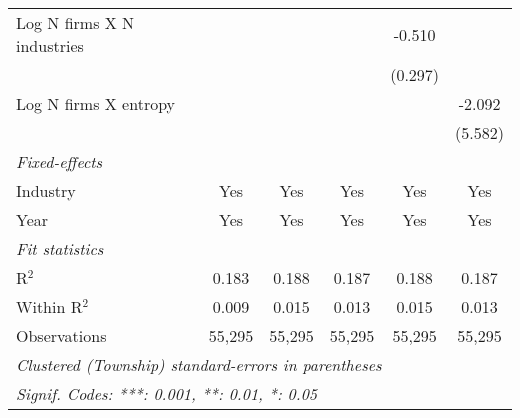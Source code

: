 \begin{tabular}{lccccc}
   Log N firms X N industries           &                 &                 &                 & -0.510          &   \\   
                                        &                 &                 &                 & (0.297)         &   \\   
   Log N firms X entropy                &                 &                 &                 &                 & -2.092\\   
                                        &                 &                 &                 &                 & (5.582)\\   
   \midrule
   \emph{Fixed-effects}\\
   Industry                             & Yes             & Yes             & Yes             & Yes             & Yes\\  
   Year                                 & Yes             & Yes             & Yes             & Yes             & Yes\\  
   \midrule
   \emph{Fit statistics}\\
   R$^2$                                & 0.183           & 0.188           & 0.187           & 0.188           & 0.187\\  
   Within R$^2$                         & 0.009           & 0.015           & 0.013           & 0.015           & 0.013\\  
   Observations                         & 55,295          & 55,295          & 55,295          & 55,295          & 55,295\\  
   \midrule \midrule
   \multicolumn{6}{l}{\emph{Clustered (Township) standard-errors in parentheses}}\\
   \multicolumn{6}{l}{\emph{Signif. Codes: ***: 0.001, **: 0.01, *: 0.05}}\\
\end{tabular}
\par\endgroup
